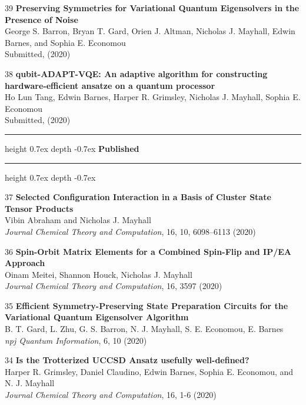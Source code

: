 \documentclass[10pt]{article}
\newenvironment{lonelist}[1][\enskip\textbullet]%
        {\vspace{-\baselineskip}\begin{list}{#1}{%
        \setlength{\partopsep}{0pt}%
        \setlength{\topsep}{0pt}}}
        {\end{list}\vspace{-.6\baselineskip}}
\def\Vhrulefill{\leavevmode\leaders\hrule height 0.7ex depth \dimexpr0.4pt-0.7ex\hfill\kern0pt}
\begin{document}
\begin{lonelist}
\item[39\hspace{4pt}] \textbf{Preserving Symmetries for Variational Quantum Eigensolvers in the  Presence of Noise} \\
 George S. Barron, Bryan T. Gard, Orien J. Altman, Nicholas J. Mayhall,
  Edwin Barnes, and Sophia E. Economou\\
Submitted, (2020)

\item[38\hspace{4pt}] \textbf{qubit-ADAPT-VQE: An adaptive algorithm for constructing hardware-efficient ansatze on a quantum processor} \\
Ho Lun Tang, Edwin Barnes, Harper R. Grimsley, Nicholas J. Mayhall, Sophia E. Economou \\
	 Submitted, (2020) 

\begin{center}
	\vspace{5pt}
	\Vhrulefill{} \textbf{Published} {} \Vhrulefill
	\vspace{4pt}
\end{center}

\item[37\hspace{4pt}] \textbf{Selected Configuration Interaction in a Basis of Cluster State Tensor Products} \\
Vibin Abraham and Nicholas J. Mayhall \\
\textsl{Journal Chemical Theory and Computation}, 16, 10, 6098–6113 (2020)


\item[36\hspace{4pt}] \textbf{Spin-Orbit Matrix Elements for a Combined Spin-Flip and IP/EA Approach} \\
Oinam Meitei, Shannon Houck, Nicholas J. Mayhall\\
	\textsl{Journal Chemical Theory and Computation}, 16, 3597 (2020)

\item[35\hspace{4pt}] \textbf{Efficient Symmetry-Preserving State Preparation Circuits for the Variational Quantum Eigensolver Algorithm} \\
B. T. Gard, L. Zhu, G. S. Barron, N. J. Mayhall, S. E. Economou, E. Barnes \\
	\textsl{npj Quantum Information}, 6, 10 (2020) 

\item[34\hspace{4pt}] \textbf{Is the Trotterized UCCSD Ansatz usefully well-defined?} \\
Harper R. Grimsley, Daniel Claudino, Edwin Barnes, Sophia E. Economou, and N. J. Mayhall \\
	\textsl{Journal Chemical Theory and Computation}, 16,  1-6 (2020)


\end{lonelist}
\end{document}
